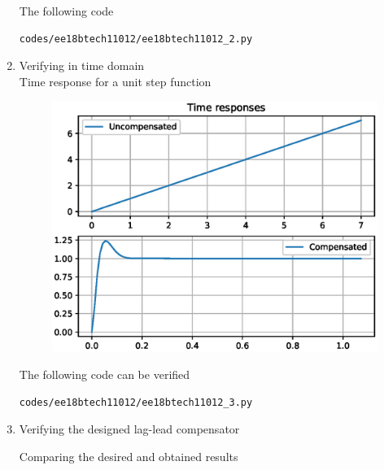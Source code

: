 \begin{enumerate}[label=\thesubsection.\arabic*.,ref=\thesubsection.\theenumi]
\begin{figure}[!ht]
\caption{}
\label{fig:ee18btech11012_3}
\end{figure}
The following code 
\begin{lstlisting}
codes/ee18btech11012/ee18btech11012_2.py
\end{lstlisting}
\item Verifying in time domain \\
\solution 
Time response for a unit step function
\begin{figure}[!ht]
\centering
  \includegraphics[width=\columnwidth]{./figs/ee18btech11012/ee18btech11012_3.eps}
\caption{}
\label{fig:ee18btech11012_4} 
\end{figure}
The following code can be verified
\begin{lstlisting}
codes/ee18btech11012/ee18btech11012_3.py
\end{lstlisting}
\item Verifying the designed lag-lead compensator \\
\solution 
\begin{table}[!ht]
\centering

\caption{Comparing the desired and obtained results}
\label{table:ee18btech11012_table1}
\end{table}
\end{enumerate}
